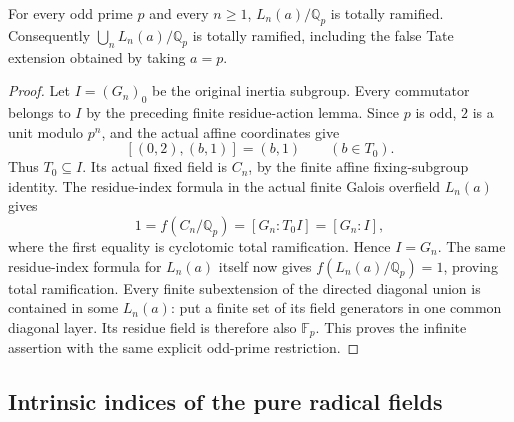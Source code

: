 \begin{theorem}
\label{ft:total-ramification}
\leanok{}
For every odd prime $p$ and every $n\geq1$, $L_n(a)/\mathbb Q_p$ is
totally ramified. Consequently $\bigcup_nL_n(a)/\mathbb Q_p$ is totally
ramified, including the false Tate extension obtained by taking $a=p$.
\end{theorem}
\begin{proof}
Let $I=(G_n)_0$ be the original inertia subgroup. Every commutator
belongs to $I$ by the preceding finite residue-action lemma.
Since $p$ is odd, $2$ is a unit modulo $p^n$, and the actual affine
coordinates give
\[
 [(0,2),(b,1)]=(b,1)\qquad(b\in T_0).
\]
Thus $T_0\subseteq I$. Its actual fixed field is $C_n$, by the
finite affine fixing-subgroup identity.
The residue-index formula in the actual finite Galois overfield
$L_n(a)$ gives
\[
 1=f(C_n/\mathbb Q_p)=[G_n:T_0I]=[G_n:I],
\]
where the first equality is cyclotomic total ramification.
Hence $I=G_n$. The same residue-index formula for $L_n(a)$ itself
now gives $f(L_n(a)/\mathbb Q_p)=1$, proving total ramification.
Every finite subextension of the directed diagonal union is contained
in some $L_n(a)$: put a finite set of its field generators in one
common diagonal layer. Its residue field is therefore also $\mathbb F_p$.
This proves the infinite assertion with the same explicit odd-prime
restriction.
\end{proof}

\subsection{Intrinsic indices of the pure radical fields}

